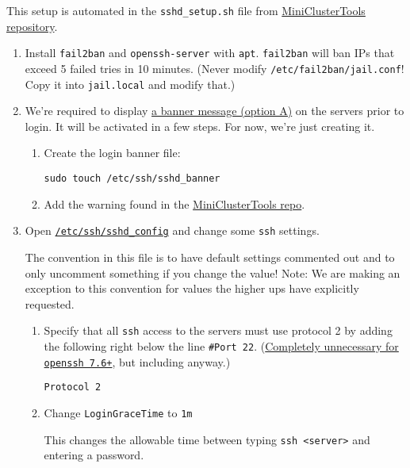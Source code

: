 This setup is automated in the \texttt{sshd\_setup.sh} file from \href{https://github.com/coyleej/MiniClusterTools}{MiniClusterTools repository}. 

\begin{enumerate}
  \item Install \texttt{fail2ban} and \texttt{openssh-server} with \texttt{apt}. \texttt{fail2ban} will ban IPs that exceed 5 failed tries in 10 minutes. (Never modify \texttt{/etc/fail2ban/jail.conf}! Copy it into \texttt{jail.local} and modify that.)

  \item We're required to display \href{https://www.stigviewer.com/stig/firewall/2015-09-18/finding/V-3013}{a banner message (option A)} on the servers prior to login. It will be activated in a few steps. For now, we're just creating it.

    \begin{enumerate}
      \item Create the login banner file: 

        \texttt{sudo touch /etc/ssh/sshd\_banner}

      \item Add the warning found in the \href{https://github.com/coyleej/MiniClusterTools/tree/master/files}{MiniClusterTools repo}. 
      \end{enumerate}

  \item Open \href{https://linux.die.net/man/5/sshd_config}{\texttt{/etc/ssh/sshd\_config}} and change some \texttt{ssh} settings.

    The convention in this file is to have default settings commented out and to only uncomment something if you change the value! Note: We are making an exception to this convention for values the higher ups have explicitly requested.

    \begin{enumerate}
      \item Specify that all \texttt{ssh} access to the servers must use protocol 2 by adding the following right below the line \texttt{\#Port 22}. (\href{https://www.openssh.com/txt/release-7.6}{Completely unnecessary for \texttt{openssh 7.6+}}, but including anyway.)

        \texttt{Protocol 2}

      \item Change \texttt{LoginGraceTime} to \texttt{1m}

        This changes the allowable time between typing \texttt{ssh <server>} and entering a password.


\end{enumerate}
\end{enumerate}
